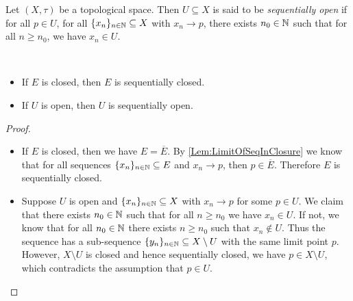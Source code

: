 \documentclass[screen]{techreport}
\numberwithin{equation}{section}
\begin{document}
\begin{definition}\label{De:SequentiallyOpen}
	Let $(X,\tau)$ be a topological space.
	Then $U \subseteq X$ is said to be \emph{sequentially open} if for all $p \in U$, for all $\{x_n\}_{n \in \mathbb{N}} \subseteq X$ with $x_n \rightarrow p$, there exists $n_0 \in \mathbb{N}$ such that for all $n \ge n_0$, we have $x_n \in U$.
\end{definition}

\begin{proposition}\label{Prop:ClosedOpenImplySeqClosedOpen}\
	\begin{itemize}
		\item If $E$ is closed, then $E$ is sequentially closed.
		\item If $U$ is open, then $U$ is sequentially open.
	\end{itemize}
\end{proposition}
\begin{proof}\
	\begin{itemize}
		\item If $E$ is closed, then we have $E = \overline{E}$.
		By \cref{Lem:LimitOfSeqInClosure} we know that for all sequences $\{x_n\}_{n \in \mathbb{N}} \subseteq E$ and $x_n \rightarrow p$, then $p \in \overline{E}$.
		Therefore $E$ is sequentially closed.
		
		\item Suppose $U$ is open and $\{x_n\}_{n \in \mathbb{N}} \subseteq X$ with $x_n \rightarrow p$ for some $p \in U$.
		We claim that there exists $n_0 \in \mathbb{N}$ such that for all $n \ge n_0$ we have $x_n \in U$.
		If not, we know that for all $n_0 \in \mathbb{N}$ there exists $n \ge n_0$ such that $x_n \not\in U$.
		Thus the sequence has a sub-sequence $\{y_n\}_{n \in \mathbb{N}} \subseteq X \setminus U$ with the same limit point $p$.
		However, $X \setminus U$ is closed and hence sequentially closed, we have $p \in X \setminus U$, which contradicts the assumption that $p \in U$.
	\end{itemize}
\end{proof}
\end{document}
